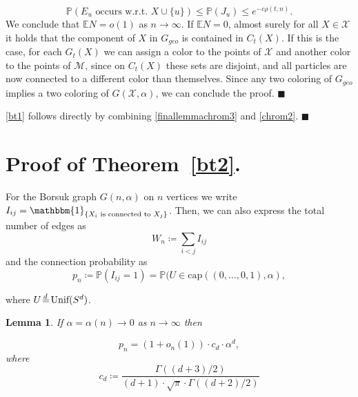 \documentclass[11pt]{article}%
\newenvironment{proof}{\vspace{1ex}\noindent{\bf Proof.}}{\hspace*{\fill}$\blacksquare$\vspace{1ex}}
\newenvironment{proofof}[1]{\vspace{1ex}\noindent{\bf Proof of #1.}}{\hspace*{\fill}$\blacksquare$\vspace{1ex}}
\newtheorem{lemma}[lemma]{Lemma}
\newcommand{\Pee}[0]{\ensuremath{{\mathbb P}}}
\newcommand{\isd}[0]{\hspace{.2ex} \raisebox{-.1ex}{$=$} \hspace{-1.5ex} 
\raisebox{1ex}{{$\scriptstyle d$}} \hspace{.8ex} }
\DeclareMathOperator{\vol}{vol}
\newcommand{\Pro}{\mathbb{P}}
\newcommand{\Ex}{\mathbb{E}}
\newcommand{\indicator}[1]{\mathbbm{1}_{\{#1\}}}
\begin{document}
\begin{proof}
    \begin{equation*}
        \Pro(E_u\text{ occurs w.r.t. }X\cup\{u\} )\leq\Pro(J_u) \leq e^{-c\rho(t,n)}.
    \end{equation*}
     We conclude that $\Ex N =o(1)$ as $n\to\infty$. If $\Ex N=0$, almost surely for all $ X\in \mathcal{X} $ it holds that the component of $ X $ in $ G_{geo}$ is contained in $ C_t(X) $. If this is the case, for each $  G_t(X)  $ we can assign a color to the points of $ \mathcal{X} $ and another color to the points of $ \mathcal{M} $, since on  $ C_t(X) $ these sets are disjoint, and all particles are now connected to a different color than themselves. Since any two coloring of $G_{geo}$ implies a two coloring of $G(\mathcal{X},\alpha)$, we can conclude the proof.
\end{proof}

\begin{proofof}{\cref{bt1}}
    \cref{bt1} follows directly by combining  \cref{finallemmachrom3} and \ref{chrom2}.
\end{proofof}



\section{Proof of Theorem~\ref{bt2}.\label{sec:bt2}}



For the Borsuk graph $G(n,\alpha)$ on $ n $ vertices we write $ I_{ij}=\indicator{X_i\text{ is connected to }X_j} $. Then, we can also express the total number of edges as
\begin{equation*}
	W_n\coloneqq\sum_{i<j}I_{ij}
\end{equation*}
and the connection probability as 
\begin{equation*}
	p_n\coloneqq\Pro(I_{ij}=1)=\Pee( U \in \text{cap}((0,\dots,0,1),\alpha), 
%
%	
\end{equation*}

\noindent
where $U \isd \text{Unif}(S^d)$.

\begin{lemma}\label{probconv}
If $\alpha = \alpha(n)\to 0$ as $ n\to \infty $ then 

$$  p_n=(1+o_n(1)) \cdot c_d %
 \cdot \alpha^d,
$$
	where
	\begin{equation*}
		c_d\coloneqq\frac{\Gamma((d+3)/2)}{(d+1)\cdot\sqrt{\pi}\cdot\Gamma((d+2)/2)}
	\end{equation*}
\end{lemma}
\end{document}

